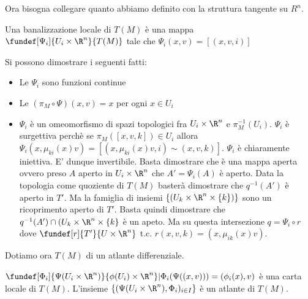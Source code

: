 Ora bisogna collegare quanto abbiamo definito con la struttura tangente su $R^n$. 
\begin{defn}
Una banalizzazione locale di $T(M)$ è una mappa $\fundef[\Psi_i]{U_i\times\R^n}{T(M)}$ tale che $\Psi_i(x, v)=[(x, v, i)]$ 
\end{defn}
\begin{oss}
Si possono dimostrare i seguenti fatti:\\
\begin{itemize}

\item Le $\Psi_i$ sono funzioni continue
\item Le $(\pi_M \circ \Psi)(x, v)=x$ per ogni $x\in U_i$
\item $\Psi_i$ è un omeomorfismo di spazi topologici fra $U_i \times \R^n$ e $\pi_M^{-1}(U_i)$. $\Psi_i$ è surgettiva perchè se $\pi_M([x, v, k])\in U_i$ allora $\Psi_i(x, \mu_{ki}(x)v)=[(x, \mu_{ki}(x)v, i)\sim (x, v, k)]$. $\Psi_i$ è chiaramente iniettiva. E' dunque invertibile. Basta dimostrare che è una mappa aperta ovvero preso $A$ aperto in $U_i\times \R^n$ che $A'=\Psi_i(A)$ è aperto. Data la topologia come quoziente di $T(M)$ basterà dimostrare che $q^{-1}(A')$ è aperto in $T'$. Ma la famiglia di insiemi $\{(U_k\times \R^n\times\{k\})\}$ sono un ricoprimento aperto di $T'$. Basta quindi dimostrare che $q^{-1}(A')\cap (U_k\times \R^n\times\{k\}$ è un apeto. Ma su questa intersezione $q=\Psi_i\circ r $ dove $\fundef[r]{T'}{U\times \R^n}$ t.c. $r(x, v, k)=(x, \mu_{ik}(x)v)$.
\end{itemize}
\end{oss}
Dotiamo ora $T(M)$ di un atlante differenziale.
\begin{defn}[Carte di $T(M)$]
$\fundef[\Phi_i]{\Psi(U_i\times \R^n)}{\phi(U_i)\times \R^n} | \Phi_i(\Psi((x, v)))=(\phi_i(x),v)$ è una carta locale di $T(M)$. L'insieme $\{(\Psi(U_i\times\R^n), \Phi_i)_{i\in I}\}$ è un atlante di $T(M)$.
\end{defn}

